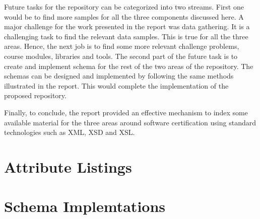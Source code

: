 \documentclass[11pt,letterpaper]{report}
\begin{document}
Future tasks for the repository can be categorized into two streams. First one would be to find more samples for all the three components discussed here. A major challenge for the work presented in the report was data gathering. It is a challenging task to find the relevant data samples. This is true for all the three areas. Hence, the next job is to find some more relevant challenge problems, course modules, libraries and tools. The second part of the future task is to create and implement schema for the rest of the two areas of the repository. The schemas can be designed and implemented by following the same methods illustrated in the report. This would complete the implementation of the proposed repository.  

Finally, to conclude, the report provided an effective mechanism to index some available material for the three areas around software certification using standard technologies such as XML, XSD and XSL.

\appendix
\chapter{Attribute Listings}


 

 

  

\chapter{Schema Implemtations}






  

 







\end{document}
